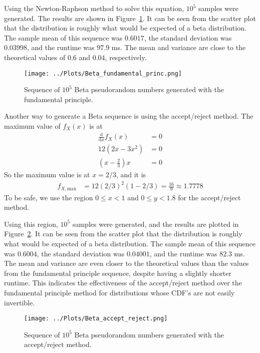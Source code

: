 \documentclass[twocolumn]{myarticle}
\renewcommand{\d}{\mathrm{d}}
\begin{document}
Using the Newton-Raphson method to solve this equation, $ 10^5 $ samples were generated.
The results are shown in Figure~\ref{fig:beta_fundamental_princ}.
It can be seen from the scatter plot that the distribution is roughly what would be expected of a beta distribution.
The sample mean of this sequence was $ 0.6017 $, the standard deviation was $ 0.03998 $, and the runtime was $ 97.9 $ ms.
The mean and variance are close to the theoretical values of $ 0.6 $ and $ 0.04 $, respectively.

\begin{figure}[ht!]
    \begin{center}
    \texttt{[image: ../Plots/Beta\_fundamental\_princ.png]}
    \caption{%
        Sequence of $ 10^5 $ Beta pseudorandom numbers generated with the fundamental principle.
    }
    \label{fig:beta_fundamental_princ}
    \end{center}
\end{figure}

Another way to generate a Beta sequence is using the accept/reject method.
The maximum value of $ f_X(x) $ is at
\begin{align}
    \frac{\d}{\d x} f_X(x) &= 0 
    \\
    12\left(2x - 3x^2\right) &= 0
    \\
    \left( x - \frac{2}{3} \right) x &= 0
\end{align}
So the maximum value is at $ x = 2/3 $, and it is
\begin{align}
    f_{X,\text{max}} &= 12 \left( 2/3 \right)^2 \left( 1 - 2/3 \right) = \frac{16}{9} \approx 1.7778
\end{align}
To be safe, we use the region $ 0 \leq x < 1 $ and $ 0 \leq y < 1.8 $ for the accept/reject method.

Using this region, $ 10^5 $ samples were generated, and the results are plotted in Figure~\ref{fig:beta_accept_reject}.
It can be seen from the scatter plot that the distribution is roughly what would be expected of a beta distribution.
The sample mean of this sequence was $ 0.6004 $, the standard deviation was $ 0.04001 $, and the runtime was $ 82.3 $ ms.
The mean and variance are even closer to the theoretical values than the values from the fundamental principle sequence, despite having a slightly shorter runtime.
This indicates the effectiveness of the accept/reject method over the fundamental principle method for distributions whose CDF's are not easily invertible.

\begin{figure}[ht!]
    \begin{center}
    \texttt{[image: ../Plots/Beta\_accept\_reject.png]}
    \caption{%
        Sequence of $ 10^5 $ Beta pseudorandom numbers generated with the accept/reject method.
    }
    \label{fig:beta_accept_reject}
    \end{center}
\end{figure}
\end{document}
